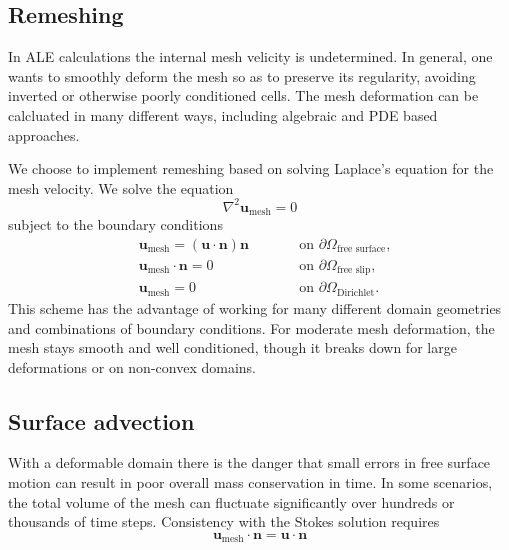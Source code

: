 \documentclass[preprint,12pt,authoryear]{elsarticle}
\begin{document}
\subsection{Remeshing}
In ALE calculations the internal mesh velicity is undetermined.
In general, one wants to smoothly deform the mesh so as to preserve its regularity, 
avoiding inverted or otherwise poorly conditioned cells.
The mesh deformation can be calcluated in many different ways, including algebraic \citep[e.g.][]{thieulot2011fantom} 
and PDE based approaches.

We choose to implement remeshing based on solving Laplace's equation for the mesh velocity.
We solve the equation
\begin{equation}
\nabla^2 \mathbf{u}_{\mathrm{mesh}} = 0
\label{eq:laplacian_smoothing}
\end{equation}
subject to the boundary conditions
\begin{equation}
\begin{aligned}
&\mathbf{u}_\mathrm{mesh} = \left( \textbf{u} \cdot \textbf{n} \right) \textbf{n} & \qquad & \textrm{on } \partial \Omega_{\textrm{free surface}}, \\
&\mathbf{u}_\mathrm{mesh} \cdot \textbf{n} = 0 & \qquad & \textrm{on } \partial \Omega_{\textrm{free slip}}, \\
&\mathbf{u}_\mathrm{mesh} = 0 & \qquad & \textrm{on } \partial \Omega_{\textrm{Dirichlet}}.
\end{aligned}
\label{eq:laplacian_bcs}
\end{equation}
This scheme has the advantage of working for many different domain geometries and combinations of boundary conditions.
For moderate mesh deformation, the mesh stays smooth and well conditioned, though it breaks down for large deformations 
or on non-convex domains.

\subsection{Surface advection}
With a deformable domain there is the danger that small errors in free surface motion can
result in poor overall mass conservation in time. In some scenarios, the total volume of the mesh can 
fluctuate significantly over hundreds or thousands of time steps.
Consistency with the Stokes solution requires 
\begin{equation}
\mathbf{u}_{\mathrm{mesh}} \cdot \mathbf{n} = \mathbf{u \cdot n}
\end{equation}
\end{document}
